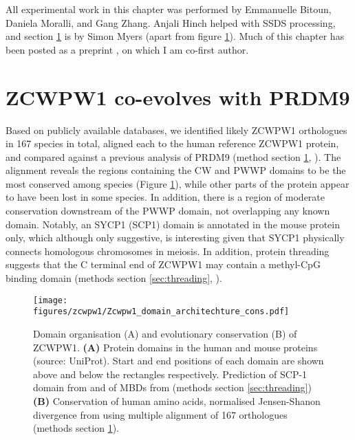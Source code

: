 \vspace{0.7cm}
\begin{framed}
\noindent All experimental work in this chapter was performed by Emmanuelle Bitoun, Daniela Moralli, and Gang Zhang. Anjali Hinch helped with SSDS processing, and section \ref{sec:coevolution} is by Simon Myers (apart from figure \ref{fig:domains}). Much of this chapter has been posted as a preprint \cite{Wells2019ZCWPW1}, on which I am co-first author.
\end{framed}

\section{ZCWPW1 co-evolves with PRDM9}
\label{sec:coevolution}
Based on publicly available databases, we identified likely ZCWPW1 orthologues in 167 species in total, aligned each to the human reference ZCWPW1 protein, and compared against a previous analysis of PRDM9 (method section \ref{sec:coevolution}, \cite{Baker2017Repeated}). The alignment reveals the regions containing the CW and PWWP domains to be the most conserved among species (Figure \ref{fig:domains}), while other parts of the protein appear to have been lost in some species. In addition, there is a region of moderate conservation downstream of the PWWP domain, not overlapping any known domain. Notably, an SYCP1 (SCP1) domain is annotated in the mouse protein only, which although only suggestive, is interesting given that SYCP1 physically connects homologous chromosomes in meiosis. In addition, protein threading suggests that the C terminal end of ZCWPW1 may contain a methyl-CpG binding domain (methods section \ref{sec:threading}, \cite{Lobley2009pGenTHREADER}).


\begin{figure}[H]
	\centering
	\texttt{[image: figures/zcwpw1/Zcwpw1\_domain\_architechture\_cons.pdf]}
	\caption[Zcwpw1 Domains and Conservation]{
		Domain organisation (A) and evolutionary conservation (B) of ZCWPW1.
		\textbf{(A)} Protein domains in the human and mouse proteins (source: UniProt). Start and end positions of each domain are shown above and below the rectangles respectively. Prediction of SCP-1 domain from \parencite{Marchler-Bauer2004CDSearch} and of MBDs from \parencite{Lobley2009pGenTHREADER} (methods section \ref{sec:threading})
		\textbf{(B)} Conservation of human amino acids, normalised Jensen-Shanon divergence from \parencite{Capra2007Predicting, Johansson2010comparative} using multiple alignment of 167 orthologues (methods section \ref{sec:coevolution}).
	}
	\label{fig:domains}
\end{figure}


